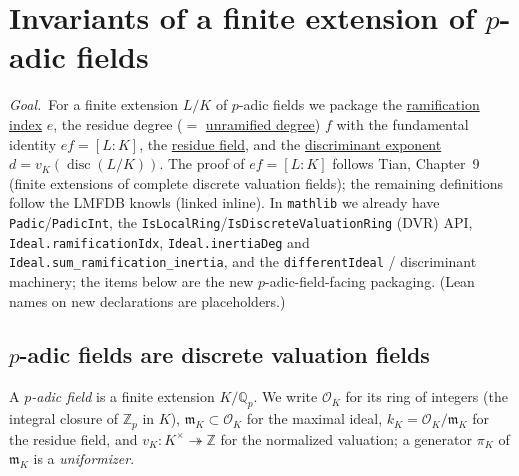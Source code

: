 \newcommand{\knowl}[2]{\href{https://www.lmfdb.org/knowledge/show/#1}{#2}}

\newcommand{\Q}{\mathbb{Q}}
\newcommand{\Z}{\mathbb{Z}}
\newcommand{\Qp}{\mathbb{Q}_p}
\newcommand{\OK}{\mathcal{O}_K}
\newcommand{\OL}{\mathcal{O}_L}
\newcommand{\mfK}{\mathfrak{m}_K}
\newcommand{\mfL}{\mathfrak{m}_L}
\newcommand{\disc}{\operatorname{disc}}
\newcommand{\Tr}{\operatorname{Tr}}
\newcommand{\Nm}{\operatorname{N}}
\newcommand{\different}{\mathfrak{d}}
\DeclareMathOperator{\dimk}{dim}



\section{Invariants of a finite extension of \texorpdfstring{$p$}{p}-adic fields}
\label{sec:local-field-invariants}

\emph{Goal.}\ For a finite extension $L/K$ of $p$-adic fields we package the
\knowl{lf.ramification_index}{ramification index} $e$, the residue degree
($=$ \knowl{lf.unramified_degree}{unramified degree}) $f$ with the fundamental
identity $ef=[L:K]$, the \knowl{lf.residue_field}{residue field}, and the
\knowl{lf.discriminant_exponent}{discriminant exponent}
$d=v_K(\disc(L/K))$. The proof of $ef=[L:K]$ follows Tian, Chapter~9 (finite
extensions of complete discrete valuation fields); the remaining definitions
follow the LMFDB knowls (linked inline). In \texttt{mathlib} we already have
\texttt{Padic}/\texttt{PadicInt}, the
\texttt{IsLocalRing}/\texttt{IsDiscreteValuationRing} (DVR) API,
\texttt{Ideal.ramificationIdx}, \texttt{Ideal.inertiaDeg} and
\texttt{Ideal.sum\_ramification\_inertia}, and the \texttt{differentIdeal} /
discriminant machinery; the \notready{} items below are the new
$p$-adic-field-facing packaging. (Lean names on new declarations are
placeholders.)

\subsection{\texorpdfstring{$p$}{p}-adic fields are discrete valuation fields}
\label{subsec:padic-dvf}

\begin{definition}
\label{def:padic-field}
\notready
A \emph{$p$-adic field} is a finite extension $K/\Qp$. We write $\OK$ for its
ring of integers (the integral closure of $\Z_p$ in $K$), $\mfK \subset \OK$ for
the maximal ideal, $k_K = \OK/\mfK$ for the residue field, and
$v_K\colon K^\times \twoheadrightarrow \Z$ for the normalized valuation; a
generator $\pi_K$ of $\mfK$ is a \emph{uniformizer}.
\end{definition}

